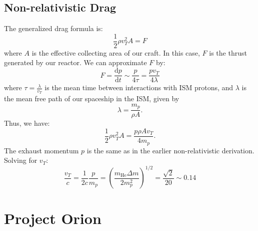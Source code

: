 \documentclass[a4paper]{article}
\def\mhe{m_{\mathrm{He}}}
\begin{document}
    \subsection{Non-relativistic Drag}
      The generalized drag formula is:
      \begin{equation}
          \frac{1}{2}\rho v_{T}^{2}A = F
      \end{equation}
      where $A$ is the effective collecting area of our craft.  In this case, $F$ is the thrust generated by our reactor.  We can approximate $F$ by:
      \begin{equation}
          F = \frac{\mathrm{d}p}{\mathrm{d}t} \sim \frac{p}{4\tau} = \frac{pv_{T}}{4\lambda}
      \end{equation}
      where $\tau = \frac{\lambda}{v_{T}}$ is the mean time between interactions with ISM protons, and $\lambda$ is the mean free path of our spaceship in the ISM, given by
      \begin{equation}
          \lambda = \frac{m_{p}}{\rho A}.
      \end{equation}
      Thus, we have:
      \begin{equation}
          \frac{1}{2}\rho v_{T}^{2}A = \frac{p\rho Av_{T}}{4m_{p}}.
      \end{equation}
      The exhaust momentum $p$ is the same as in the earlier non-relativistic derivation.  Solving for $v_{T}$:
      \begin{equation}
          \frac{v_{T}}{c} = \frac{1}{2c}\frac{p}{m_{p}} = \left(\frac{\mhe\Delta m}{2m_{p}^{2}}\right)^{1/2} = \frac{\sqrt{2}}{20} \sim 0.14
      \end{equation}
    
  \section{Project Orion}
\end{document}
